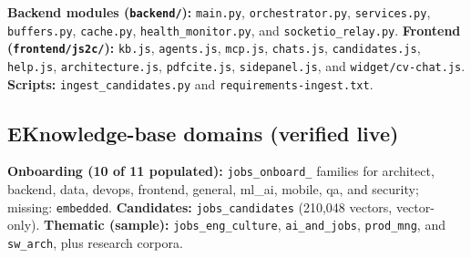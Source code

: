 \textbf{Backend modules (\texttt{backend/}):} \verb|main.py|, \verb|orchestrator.py|,
\verb|services.py|, \verb|buffers.py|, \verb|cache.py|, \verb|health_monitor.py|, and
\verb|socketio_relay.py|. \textbf{Frontend (\texttt{frontend/js2c/}):} \verb|kb.js|,
\verb|agents.js|, \verb|mcp.js|, \verb|chats.js|, \verb|candidates.js|, \verb|help.js|,
\verb|architecture.js|, \verb|pdfcite.js|, \verb|sidepanel.js|, and \verb|widget/cv-chat.js|.
\textbf{Scripts:} \verb|ingest_candidates.py| and \verb|requirements-ingest.txt|.

\subsection*{E\quad Knowledge-base domains (verified live)}

\textbf{Onboarding (10 of 11 populated):} \verb|jobs_onboard_| families for architect,
backend, data, devops, frontend, general, ml\_ai, mobile, qa, and security; missing:
\texttt{embedded}. \textbf{Candidates:} \verb|jobs_candidates| (210,048 vectors,
vector-only). \textbf{Thematic (sample):} \verb|jobs_eng_culture|, \verb|ai_and_jobs|,
\verb|prod_mng|, and \verb|sw_arch|, plus research corpora.

